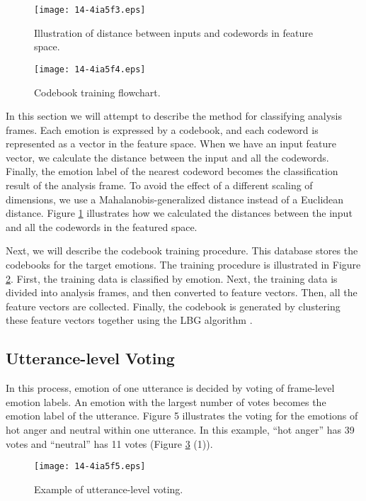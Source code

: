\documentclass[english]{jnlp_1.3e}
\begin{document}
\begin{figure}[b]
\begin{center}
    \texttt{[image: 14-4ia5f3.eps]}
\caption{Illustration of distance between inputs and codewords in feature space.}
\label{fig03}
\end{center}
\end{figure}
\begin{figure}[b]
\begin{center}
    \texttt{[image: 14-4ia5f4.eps]}
\caption{Codebook training flowchart.}
\label{fig04}
\end{center}
\end{figure}

In this section we will attempt to describe the method for classifying analysis frames. Each emotion is expressed by a codebook, and each codeword is represented as a vector in the feature space. When we have an input feature vector, we calculate the distance between the input and all the codewords. Finally, the emotion label of the nearest codeword becomes the classification result of the analysis frame. To avoid the effect of a different scaling of dimensions, we use a Mahalanobis-generalized distance instead of a Euclidean distance. Figure \ref{fig03} illustrates how we calculated the distances between the input and all the codewords in the featured space.

Next, we will describe the codebook training procedure. This database stores the codebooks for the target emotions. The training procedure is illustrated in Figure \ref{fig04}. First, the training data is classified by emotion. Next, the training data is divided into analysis frames, and then converted to feature vectors. Then, all the feature vectors are collected. Finally, the codebook is generated by clustering these feature vectors together using the LBG algorithm \cite{Linde1980}.


\subsection{Utterance-level Voting}

In this process, emotion of one utterance is decided by voting of frame-level emotion labels. An emotion with the largest number of votes becomes the emotion label of the utterance. Figure 5 illustrates the voting for the emotions of hot anger and neutral within one utterance. In this example, ``hot anger'' has 39 votes and ``neutral'' has 11 votes (Figure \ref{fig05} (1)).

\begin{figure}[b]
\begin{center}
    \texttt{[image: 14-4ia5f5.eps]}
\caption{Example of utterance-level voting.}
\label{fig05}
\end{center}
\end{figure}
\end{document}
